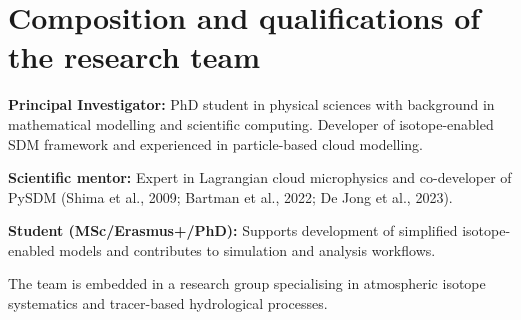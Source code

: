 \documentclass[12pt]{article}
\begin{document}
\section{Composition and qualifications of the research team}

\noindent\textbf{Principal Investigator:} PhD student in physical sciences with background
in mathematical modelling and scientific computing.
Developer of isotope-enabled
SDM framework and experienced in particle-based cloud modelling.

\noindent\textbf{Scientific mentor:} Expert in Lagrangian cloud microphysics and co-developer
of PySDM (Shima et al., 2009; Bartman et al., 2022; De Jong et al., 2023).

\noindent\textbf{Student (MSc/Erasmus+/PhD):} Supports development of simplified isotope-enabled
models and contributes to simulation and analysis workflows.

The team is embedded in a research group specialising in atmospheric isotope systematics
and tracer-based hydrological processes.

\appendix

\clearpage
\printbibliography
\end{document}

